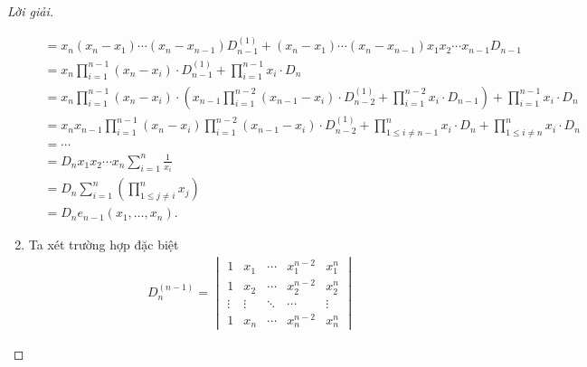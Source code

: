 \documentclass[class=linear-algebra,crop=false]{standalone}
\begin{document}
\begin{proof}[Lời giải]
\begin{enumerate}[label = (\alph*)]
\begin{align*}
			                  & = x_{n}(x_{n} - x_{1})\cdots(x_{n} - x_{n-1})D^{(1)}_{n-1} + (x_{n} - x_{1})\cdots (x_{n} - x_{n-1}) x_{1}x_{2}\cdots x_{n-1}D_{n-1}                                                               \\
			                  & = x_{n}\prod^{n-1}_{i=1}(x_{n} - x_{i}) \cdot D^{(1)}_{n-1} + \prod^{n-1}_{i=1}x_{i} \cdot D_{n}                                                                                                   \\
			                  & = x_{n}\prod^{n-1}_{i=1}(x_{n} - x_{i}) \cdot \left(x_{n-1}\prod^{n-2}_{i=1}(x_{n-1} - x_{i})\cdot D^{(1)}_{n-2} + \prod^{n-2}_{i=1}x_{i}\cdot D_{n-1}\right) + \prod^{n-1}_{i=1}x_{i} \cdot D_{n} \\
			                  & = x_{n}x_{n-1}\prod^{n-1}_{i=1}(x_{n} - x_{i})\prod^{n-2}_{i=1}(x_{n-1} - x_{i})\cdot D^{(1)}_{n-2} + \prod^{n}_{1\le i\ne n-1}x_{i}\cdot D_{n} + \prod^{n}_{1\le i\ne n}x_{i}\cdot D_{n}          \\
			                  & = \cdots                                                                                                                                                                                           \\
			                  & = D_{n}x_{1}x_{2}\cdots x_{n}\sum^{n}_{i=1}\frac{1}{x_{i}}                                                                                                                                         \\
			                  & = D_{n}\sum^{n}_{i=1}\left(\prod^{n}_{1\le j\ne i}x_{j}\right)                                                                                                                                     \\
			                  & = D_{n}e_{n-1}(x_{1},\ldots, x_{n}).
		      \end{align*}
		      \endgroup{}
		\item
		      \par Ta xét trường hợp đặc biệt
		      \begin{align*}
			       & D^{(n-1)}_{n} =
			      \begin{vmatrix}
				      1      & x_{1}  & \cdots & x_{1}^{n-2} & x_{1}^{n} \\
				      1      & x_{2}  & \cdots & x_{2}^{n-2} & x_{2}^{n} \\
				      \vdots & \vdots & \ddots & \cdots      & \vdots    \\
				      1      & x_{n}  & \cdots & x_{n}^{n-2} & x_{n}^{n}

\end{vmatrix}
\end{align*}
\end{enumerate}
\end{proof}
\end{document}
